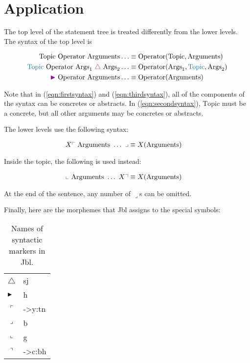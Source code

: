 \documentclass{book}
\newcommand{\lname}{Jbl}
\begin{document}
\section{Application}

The top level of the statement tree is treated differently from the lower levels. The syntax of the top level is

\begin{align}
  \text{Topic } \text{Operator } \text{Arguments} \ldots &\equiv \text{Operator}(\text{Topic}, \text{Arguments})
  \label{eqn:firstsyntax} \\
  \hliii{\text{Topic }} \text{Operator } \text{Args}_1 \ \hli{\triangle}\  \text{Args}_2 \ldots
    &\equiv \text{Operator}(\text{Args}_1, \hliii{\text{Topic}}, \text{Args}_2)
  \label{eqn:secondsyntax} \\
  \hli{\blacktriangleright} \text{ Operator } \text{Arguments} \ldots &\equiv \text{Operator}(\text{Arguments})
  \label{eqn:thirdsyntax}
\end{align}

Note that in (\ref{eqn:firstsyntax}) and (\ref{eqn:thirdsyntax}), all of the components of the syntax can be concretes or abstracts. In (\ref{eqn:secondsyntax}), $\text{Topic}$ must be a concrete, but all other arguments may be concretes or abstracts.

The lower levels use the following syntax:

\begin{align}
  X\hlii{\ulcorner}\  \text{Arguments } \ldots\  \hlii{\lrcorner} &\equiv X(\text{Arguments})
\end{align}

Inside the topic, the following is used instead:

\begin{align}
  \hlii{\llcorner}\  \text{Arguments } \ldots\  X\hlii{\urcorner} &\equiv X(\text{Arguments})
\end{align}

At the end of the sentence, any number of $\lrcorner$s can be omitted.

Finally, here are the morphemes that \lname{} assigns to the special symbols:

\begin{table}[h]
  \caption{Names of syntactic markers in \lname.}
  \centering
  \begin{tabular}{l>{\kardinal}l}
    $\triangle$ & sj \\
    $\blacktriangleright$ & h \\
    $\ulcorner$ & ->y:tn \\
    $\lrcorner$ & b \\
    $\llcorner$ & g \\
    $\urcorner$ & ->c:bh \\
  \end{tabular}
\end{table}
\end{document}
